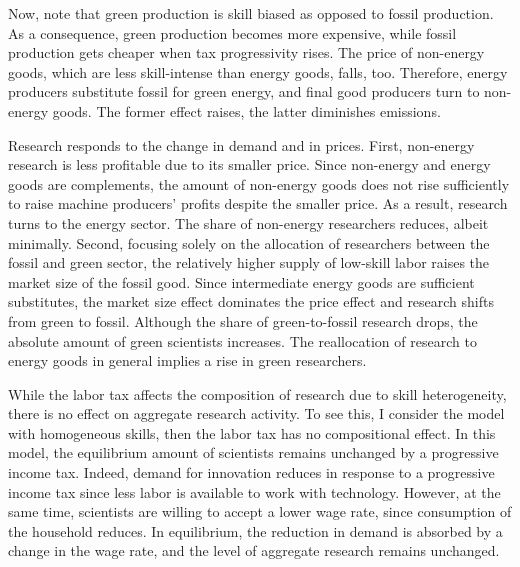  
 Now, note that green production is skill biased as opposed to fossil production.
 As a  consequence, green production becomes more expensive, while fossil production gets cheaper when tax progressivity rises. The price of non-energy goods, which are less skill-intense than energy goods, falls, too. Therefore, energy producers substitute fossil for green energy, and final good producers turn to non-energy goods. The former effect raises, the latter diminishes emissions.
 
 
 Research responds to the change in demand and in prices. First, non-energy research is less profitable due to its smaller price. Since non-energy and energy goods are complements, the amount of non-energy goods does not rise sufficiently to raise machine producers' profits despite the smaller price. As a result, research turns to the energy sector. The share of non-energy researchers reduces, albeit minimally. %
 Second, focusing solely on the allocation of researchers between the fossil and green sector, the relatively higher supply of low-skill labor raises the market size of the fossil good. Since intermediate energy goods are sufficient substitutes, the market size effect dominates the price effect and research shifts from green to fossil.
 Although the share of green-to-fossil research drops, the absolute amount of green scientists increases. The reallocation of research to energy goods in general implies a rise in green researchers. 
 
 While the labor tax affects the composition of research due to skill heterogeneity, there is no effect on aggregate research activity. 
 To see this, I consider the model with homogeneous skills, then the labor tax has no compositional effect. In this model, the equilibrium amount of scientists remains unchanged by a progressive income tax. Indeed, demand for innovation reduces in response to a progressive income tax since less labor is available to work with technology. However, at the same time, scientists are willing to accept a lower wage rate, since consumption of the household reduces. In equilibrium, the reduction in demand is absorbed by a change in the wage rate, and the level of aggregate research remains unchanged. 
 
